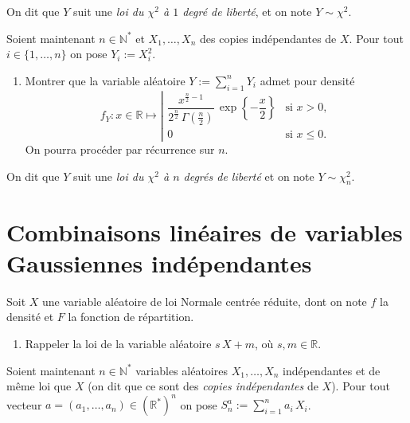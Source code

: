 On dit que \(Y\) suit une \emph{loi du \(\chi^2\) à \(1\) degré de
liberté}, et on note \(Y \sim \chi^2\).

\label{II-khi2-ndl}
Soient maintenant \(n\in\mathbb{N}^\ast\) et \(X_1,\dots,X_n\) des
copies indépendantes de \(X\). Pour tout \(i \in \{1,\dots,n\}\) on pose
\(Y_i := X_i^2\).

\begin{enumerate}
\def\labelenumi{\arabic{enumi}.}
\setcounter{enumi}{1}
\tightlist
\item
  Montrer que la variable aléatoire \(Y := \sum_{i = 1}^n Y_i\) admet
  pour densité
  \[ f_Y : x\in\mathbb{R}\mapsto \left|\begin{array}{ll} \dfrac{x^{\frac{n}{2} - 1}}{2^{\frac{n}{2}}\,\Gamma\left(\frac{n}{2}\right)}\,\exp\left\{ -\dfrac{x}{2} \right\} & \text{si } x> 0,\\ 0 & \text{si } x \leq 0. \end{array}\right.\]
  On pourra procéder par récurrence sur \(n\).
\end{enumerate}

On dit que \(Y\) suit une \emph{loi du \(\chi^2\) à \(n\) degrés de
liberté} et on note \(Y \sim \chi^2_n\).

\section{Combinaisons linéaires de variables Gaussiennes
indépendantes}\label{II-combinaisons-linuxe9aires-de-variables-gaussiennes-induxe9pendantes}

Soit \(X\) une variable aléatoire de loi Normale centrée réduite, dont
on note \(f\) la densité et \(F\) la fonction de répartition.

\label{II-CLIGauss-pre}

\begin{enumerate}
\def\labelenumi{\arabic{enumi}.}
\tightlist
\item
  Rappeler la loi de la variable aléatoire \(s\,X + m\), où
  \(s, m \in \mathbb{R}\).
\end{enumerate}


\label{II-CLIGauss-cl}
Soient maintenant \(n\in\mathbb{N}^\ast\) variables aléatoires
\(X_1,\dots,X_n\) indépendantes et de même loi que \(X\) (on dit que ce
sont des \emph{copies indépendantes} de \(X\)). Pour tout vecteur
\(a = (a_1,\dots,a_n) \in (\mathbb{R}^{*})^n\) on pose
\(S_n^a := \sum_{i = 1}^n a_i\,X_i\).

